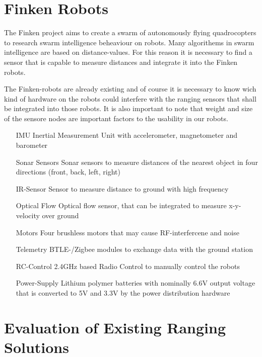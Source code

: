 \section{Finken Robots}

The Finken project aims to create a swarm of autonomously flying quadrocopters to research swarm intelligence beheaviour on robots.
Many algorithems in swarm intelligence are based on distance-values.
For this reason it is necessary to find a sensor that is capable to measure distances and integrate it into the Finken robots. 

The Finken-robots are already existing and of course it is necessary to know wich kind of hardware on the robots could interfere with the ranging sensors that shall be integrated into those robots.
It is also important to note that weight and size of the sensore nodes are important factors to the usability in our robots.

\begin{itemize}
	\item[IMU] Inertial Measurement Unit with accelerometer, magnetometer and barometer
	\item[Sonar Sensors] Sonar sensors to measure distances of the nearest object in four directions (front, back, left, right)
	\item[IR-Sensor] Sensor to measure distance to ground with high frequency
	\item[Optical Flow] Optical flow sensor, that can be integrated to measure x-y-velocity over ground
	\item[Motors] Four brushless motors that may cause RF-interfercene and noise
	\item[Telemetry] BTLE-/Zigbee modules to exchange data with the ground station
	\item[RC-Control] 2.4GHz based Radio Control to manually control the robots
	\item[Power-Supply] Lithium polymer batteries with nominally 6.6V output voltage that is converted to 5V and 3.3V by the power distribution hardware
\end{itemize}

\section{Evaluation of Existing Ranging Solutions}

